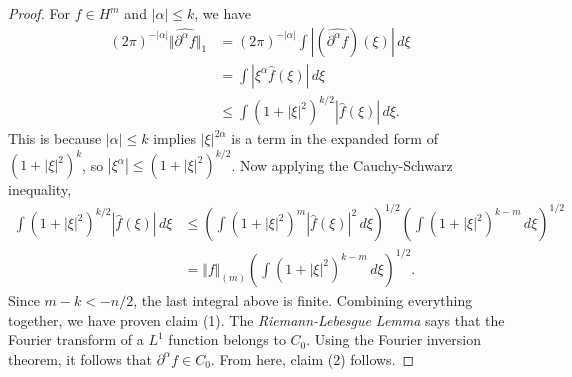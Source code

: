 \documentclass[10pt,a4paper]{amsart}
\numberwithin{equation}{section}
\begin{document}
\begin{proof}
    For $f\in H^m$ and $|\alpha|\le k$, we have
    \begin{align*}
        (2\pi)^{-|\alpha|} \Vert \widehat{\partial^\alpha f}\Vert_1 &=(2\pi)^{-|\alpha|}\int |(\widehat{\partial^\alpha f})(\xi) |\, d\xi\\  &= \int |\xi^\alpha \widehat{f}(\xi)|\, d\xi \\
        &\le \int (1+|\xi|^2)^{k/2} |\widehat{f}(\xi)|\, d\xi.
    \end{align*}
    This is because $|\alpha| \le k$ implies $|\xi|^{2\alpha}$ is a term in the expanded form of $(1+|\xi|^2)^k$, so $|\xi^\alpha|\le (1+|\xi|^2)^{k/2}$. Now applying the Cauchy-Schwarz inequality,
    \begin{align*}
        \int (1+|\xi|^2)^{k/2} |\widehat{f}(\xi)| \, d\xi &\le \left( \int (1+|\xi|^2)^{m} |\widehat{f}(\xi)|^2\, d\xi\right)^{1/2}\left( \int (1+|\xi|^2)^{k-m}\, d\xi\right)^{1/2}\\
        &= \Vert f \Vert_{(m)}\left( \int (1+|\xi|^2)^{k-m}\, d\xi\right)^{1/2}.
    \end{align*}
    Since $m-k< - n/2$, the last integral above is finite. Combining everything together, we have proven claim (1). The \textit{Riemann-Lebesgue Lemma} says that the Fourier transform of a $L^1$ function belongs to $C_0$. Using the Fourier inversion theorem, it follows that $\partial^\alpha f\in C_0$. From here, claim (2) follows.  
\end{proof}
\end{document}
